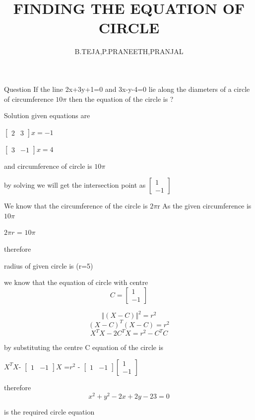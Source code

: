 \documentclass[17pt]{beamer}
\author{B.TEJA,P.PRANEETH,PRANJAL}
\title{FINDING THE EQUATION OF CIRCLE}
\begin{document}
\begin{frame}
\titlepage
\end{frame}
\begin{frame}[t]{Question}
If the line 2x+3y+1=0 and 3x-y-4=0 lie along the diameters of a circle of circumference $10\pi$
 then the equation of the circle is ?
\end{frame}
\begin{frame}[t]{Solution}
given equations are

\hspace{5cm}
$\begin{bmatrix}
2&3
\end{bmatrix}x=-1$

\hspace{5cm}
$\begin{bmatrix}
3&-1
\end{bmatrix}x=4$

and circumference of circle is $10\pi$

by solving 
we will get the intersection point as 
$\begin{bmatrix}
1\\
-1
\end{bmatrix}$
\end{frame}
\begin{frame}
We know that the circumference of the circle is $2\pi$r
As the given circumference is $10\pi$


\hspace{3cm}
$2\pi
r$
=
$10
\pi$


therefore 

radius of given circle is (r=5)

\end{frame}
\begin{frame}
we know that the equation of circle with centre 
\[C=\begin{bmatrix}
1\\
-1
\end{bmatrix}\]

\hspace{3cm}
 \[ \Vert(X-C)\Vert^2
 =r^2\]
 \[(X-C)^T (X-C)
 =r^2\]
 \[X^T X
 -2C^T X
 =
 r^2
 -C^T C\]
  \end{frame}
 \begin{frame}
 by substituting the centre C
 equation of the circle is 

 $X^T X$-
   $\begin{bmatrix}
1&-1
\end{bmatrix}X$
=$r^2$ - $\begin{bmatrix}
1&-1
\end{bmatrix}$$\begin{bmatrix}
1\\
-1
\end{bmatrix}$

therefore
\[x^2
+
y^2
-2x
+2y
-23
=0\]

is the required circle equation
\end{frame}
\end{document}
